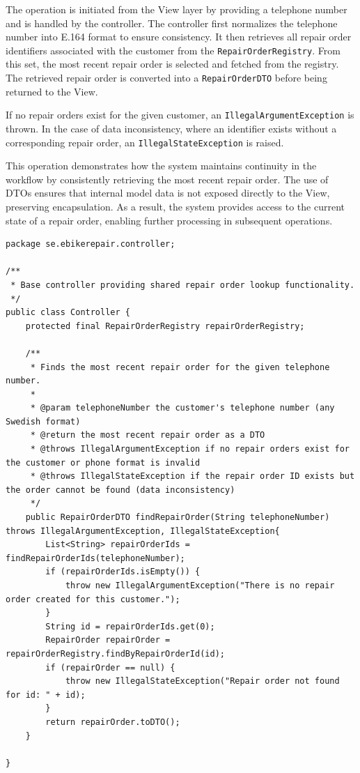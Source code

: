 \documentclass[a4paper]{scrartcl}
\begin{document}
The operation is initiated from the View layer by providing a telephone number and is handled by the controller. The controller first normalizes the telephone number into E.164 format to ensure consistency. It then retrieves all repair order identifiers associated with the customer from the \texttt{RepairOrderRegistry}. From this set, the most recent repair order is selected and fetched from the registry. The retrieved repair order is converted into a \texttt{RepairOrderDTO} before being returned to the View.

If no repair orders exist for the given customer, an \texttt{IllegalArgumentException} is thrown. In the case of data inconsistency, where an identifier exists without a corresponding repair order, an \texttt{IllegalStateException} is raised.

This operation demonstrates how the system maintains continuity in the workflow by consistently retrieving the most recent repair order. The use of DTOs ensures that internal model data is not exposed directly to the View, preserving encapsulation. As a result, the system provides access to the current state of a repair order, enabling further processing in subsequent operations.

\begin{lstlisting}[style=javastyle, caption={Main class entry point}]
package se.ebikerepair.controller;

/**
 * Base controller providing shared repair order lookup functionality.
 */
public class Controller {
    protected final RepairOrderRegistry repairOrderRegistry;

    /**
     * Finds the most recent repair order for the given telephone number.
     *
     * @param telephoneNumber the customer's telephone number (any Swedish format)
     * @return the most recent repair order as a DTO
     * @throws IllegalArgumentException if no repair orders exist for the customer or phone format is invalid
     * @throws IllegalStateException if the repair order ID exists but the order cannot be found (data inconsistency)
     */
    public RepairOrderDTO findRepairOrder(String telephoneNumber) throws IllegalArgumentException, IllegalStateException{
        List<String> repairOrderIds = findRepairOrderIds(telephoneNumber);
        if (repairOrderIds.isEmpty()) {
            throw new IllegalArgumentException("There is no repair order created for this customer.");
        }
        String id = repairOrderIds.get(0);
        RepairOrder repairOrder = repairOrderRegistry.findByRepairOrderId(id);
        if (repairOrder == null) {
            throw new IllegalStateException("Repair order not found for id: " + id);
        }
        return repairOrder.toDTO();
    }
    
}
\end{lstlisting}
\end{document}
